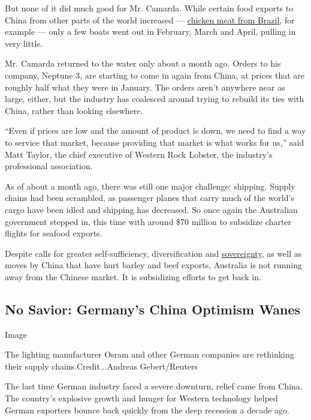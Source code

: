 But none of it did much good for Mr. Camarda. While certain food exports
to China from other parts of the world increased ---
\href{https://www.poultryworld.net/Meat/Articles/2020/3/Brazilian-chicken-exports-to-China-grow-59-despite-Covid19-556245E/}{chicken
meat from Brazil}, for example --- only a few boats went out in
February, March and April, pulling in very little.

Mr. Camarda returned to the water only about a month ago. Orders to his
company, Neptune 3, are starting to come in again from China, at prices
that are roughly half what they were in January. The orders aren't
anywhere near as large, either, but the industry has coalesced around
trying to rebuild its ties with China, rather than looking elsewhere.

``Even if prices are low and the amount of product is down, we need to
find a way to service that market, because providing that market is what
works for us,'' said Matt Taylor, the chief executive of Western Rock
Lobster, the industry's professional association.

As of about a month ago, there was still one major challenge: shipping.
Supply chains had been scrambled, as passenger planes that carry much of
the world's cargo have been idled and shipping has decreased. So once
again the Australian government stepped in, this time with around \$70
million to subsidize charter flights for seafood exports.

Despite calls for greater self-sufficiency, diversification and
\href{https://www.skynews.com.au/details/_6147890749001}{sovereignty},
as well as moves by China that have hurt barley and beef exports,
Australia is not running away from the Chinese market. It is subsidizing
efforts to get back in.

\hypertarget{no-savior-germanys-china-optimism-wanes}{%
\subsection{No Savior: Germany's China Optimism
Wanes}\label{no-savior-germanys-china-optimism-wanes}}

Image

The lighting manufacturer Osram and other German companies are
rethinking their supply chains.Credit...Andreas Gebert/Reuters

The last time German industry faced a severe downturn, relief came from
China. The country's explosive growth and hunger for Western technology
helped German exporters bounce back quickly from the deep recession a
decade ago.

